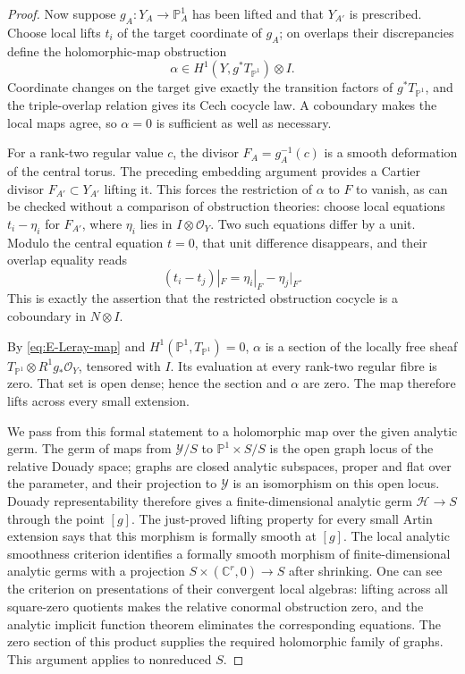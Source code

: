 \begin{proof}
Now suppose $g_A:Y_A\to\mathbb P^1_A$ has been lifted and that
$Y_{A'}$ is prescribed. Choose local lifts $t_i$ of the target
coordinate of $g_A$; on overlaps their discrepancies define the
holomorphic-map obstruction
\[
 \alpha\in H^1(Y,g^*T_{\mathbb P^1})\otimes I.
\]
Coordinate changes on the target give exactly the transition factors
of $g^*T_{\mathbb P^1}$, and the triple-overlap relation gives its
Cech cocycle law. A coboundary makes the local maps agree, so
$\alpha=0$ is sufficient as well as necessary.

For a rank-two regular value $c$, the divisor
$F_A=g_A^{-1}(c)$ is a smooth deformation of the central torus.
The preceding embedding argument provides a Cartier divisor
$F_{A'}\subset Y_{A'}$ lifting it. This forces the restriction
of $\alpha$ to $F$ to vanish, as can be checked without a comparison
of obstruction theories: choose local equations $t_i-\eta_i$ for
$F_{A'}$, where $\eta_i$ lies in $I\otimes\mathcal O_Y$.
Two such equations differ by a unit. Modulo the central equation
$t=0$, that unit difference disappears, and their overlap equality
reads
\[
 (t_i-t_j)|_F=\eta_i|_F-\eta_j|_F.
\]
This is exactly the assertion that the restricted obstruction
cocycle is a coboundary in $N\otimes I$.

By \eqref{eq:E-Leray-map} and $H^1(\mathbb P^1,T_{\mathbb P^1})=0$,
$\alpha$ is a section of the locally free sheaf
$T_{\mathbb P^1}\otimes R^1g_*\mathcal O_Y$, tensored with $I$.
Its evaluation at every rank-two regular fibre is zero. That set
is open dense; hence the section and $\alpha$ are zero. The map
therefore lifts across every small extension.

We pass from this formal statement to a holomorphic map over the
given analytic germ. The germ of maps from $\mathcal Y/S$ to
$\mathbb P^1\times S/S$ is the open graph locus of the relative
Douady space; graphs are closed analytic subspaces, proper and
flat over the parameter, and their projection to $\mathcal Y$ is
an isomorphism on this open locus. Douady representability
\cite[\S9, Theorems 1--2; Appendix, \S2, Theorem 1]{Douady1966} therefore
gives a finite-dimensional analytic germ $\mathcal H\to S$
through the point $[g]$. The just-proved lifting property for every
small Artin extension says that this morphism is formally smooth
at $[g]$. The local analytic smoothness criterion identifies a
formally smooth morphism of finite-dimensional analytic germs with
a projection $S\times(\mathbb C^r,0)\to S$ after shrinking. One
can see the criterion on presentations of their convergent local
algebras: lifting across all square-zero quotients makes the
relative conormal obstruction zero, and the analytic implicit
function theorem eliminates the corresponding equations. The
zero section of this product supplies the required holomorphic
family of graphs. This argument applies to nonreduced $S$.


\end{proof}
